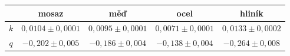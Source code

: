 \begin{tabular}{ccccc}																						\toprule
	&	mosaz					&	měď					&	ocel				&	hliník				\\	\midrule
$k$	&	$0,0104 \pm 0,0001$		&	$0,0095 \pm 0,0001$ &	$0,0071 \pm 0,0001$	&	$0,0133 \pm 0,0002$	\\	
$q$	&	$-0,202 \pm 0,005 $		&	$-0,186 \pm 0,004 $ &	$-0,138 \pm 0,004 $	&	$-0,264 \pm 0,008 $	\\	\bottomrule
\end{tabular}